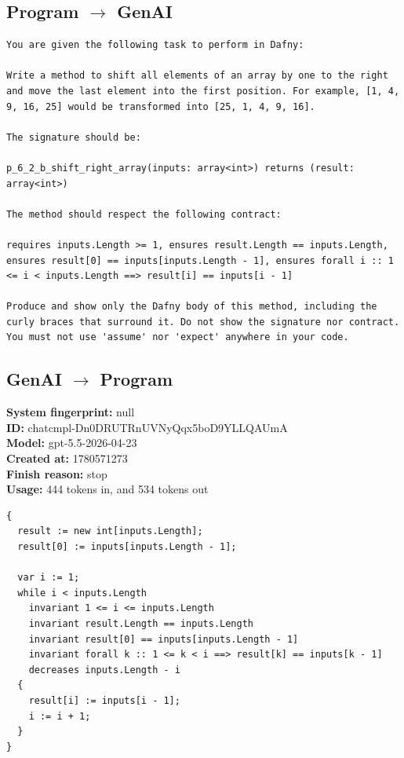 \documentclass{article}
\begin{document}
\subsection*{Program $\rightarrow$ GenAI}
\begin{lstlisting}
You are given the following task to perform in Dafny:

Write a method to shift all elements of an array by one to the right and move the last element into the first position. For example, [1, 4, 9, 16, 25] would be transformed into [25, 1, 4, 9, 16].

The signature should be:

p_6_2_b_shift_right_array(inputs: array<int>) returns (result: array<int>)

The method should respect the following contract:

requires inputs.Length >= 1, ensures result.Length == inputs.Length, ensures result[0] == inputs[inputs.Length - 1], ensures forall i :: 1 <= i < inputs.Length ==> result[i] == inputs[i - 1]

Produce and show only the Dafny body of this method, including the curly braces that surround it. Do not show the signature nor contract. You must not use 'assume' nor 'expect' anywhere in your code.
\end{lstlisting}
\subsection*{GenAI $\rightarrow$ Program}
\textbf{System fingerprint: }null
\\\textbf{ID: }chatcmpl-Dn0DRUTRnUVNyQqx5boD9YLLQAUmA
\\\textbf{Model: }gpt-5.5-2026-04-23
\\\textbf{Created at: }1780571273
\\\textbf{Finish reason: }stop
\\\textbf{Usage: }444 tokens in, and 534 tokens out
\begin{lstlisting}
{
  result := new int[inputs.Length];
  result[0] := inputs[inputs.Length - 1];

  var i := 1;
  while i < inputs.Length
    invariant 1 <= i <= inputs.Length
    invariant result.Length == inputs.Length
    invariant result[0] == inputs[inputs.Length - 1]
    invariant forall k :: 1 <= k < i ==> result[k] == inputs[k - 1]
    decreases inputs.Length - i
  {
    result[i] := inputs[i - 1];
    i := i + 1;
  }
}
\end{lstlisting}
\end{document}
